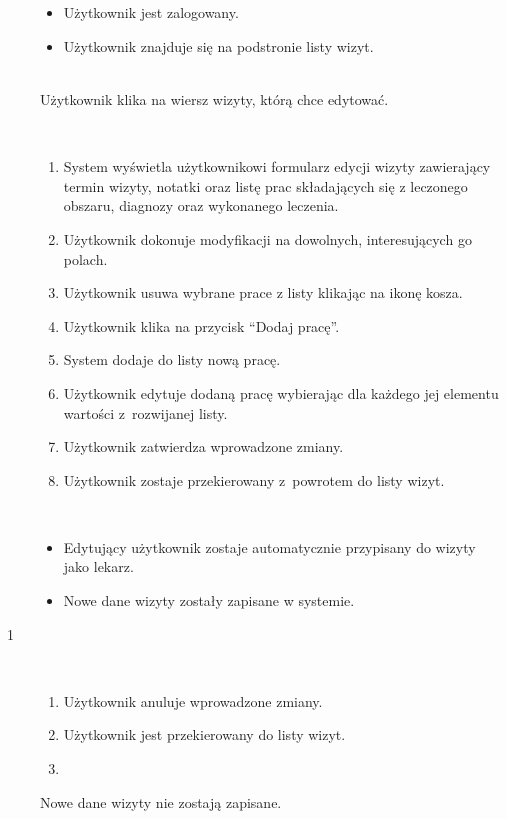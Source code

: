 \documentclass[11pt]{aghdpl}
\begin{document}
	\begin{description}
		\item[\useCaseAktor] \hfill \\
			\useCaseUzytkownik
		\item[\useCaseWarPocz] \hfill \\
			\begin{itemize}
				\item Użytkownik jest zalogowany.
				\item Użytkownik znajduje się na podstronie listy wizyt.
			\end{itemize}
		\item[\useCaseZdarzInicj] \hfill \\
			Użytkownik klika na wiersz wizyty, którą chce edytować.
		\item[\useCaseScenBaz] \hfill \\ 
			\begin{enumerate}
				\item System wyświetla użytkownikowi formularz edycji wizyty zawierający termin wizyty, notatki oraz listę prac składających się z leczonego obszaru, diagnozy oraz wykonanego leczenia.
				\item Użytkownik dokonuje modyfikacji na dowolnych, interesujących go polach.
				\item Użytkownik usuwa wybrane prace z listy klikając na ikonę kosza.
				\item Użytkownik klika na przycisk ``Dodaj pracę''.
				\item System dodaje do listy nową pracę.
				\item Użytkownik edytuje dodaną pracę wybierając dla każdego jej elementu wartości z~rozwijanej listy.
				\item Użytkownik zatwierdza wprowadzone zmiany.
				\item Użytkownik zostaje przekierowany z~powrotem do listy wizyt.
			\end{enumerate}
		\item[\useCaseWarKonc] \hfill \\ 
			\begin{itemize}
				\item Edytujący użytkownik zostaje automatycznie przypisany do wizyty jako lekarz.
				\item Nowe dane wizyty zostały zapisane w systemie.
			\end{itemize}
			
		\item[\useCaseWyjatek~1] \hfill \\
			\begin{enumerate}[label=3a\arabic*.]
				\item Użytkownik anuluje wprowadzone zmiany.
				\item Użytkownik jest przekierowany do listy wizyt.
				\item \useCaseEnd
			\end{enumerate}
			Nowe dane wizyty nie zostają zapisane.
	\end{description}
	
\end{document}
